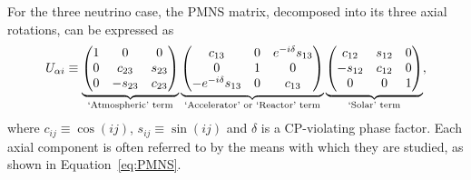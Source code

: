 For the three neutrino case, the PMNS matrix, decomposed into its three axial rotations, can be expressed as
\begin{equation}
  U_{\alpha i} \equiv
  \underbrace{
    \begin{pmatrix}
      1 & 0 & 0 \\
      0 & c_{23} & s_{23} \\
      0 & -s_{23} & c_{23} \\
    \end{pmatrix}
  }_{\textnormal{`Atmospheric' term}}
  \underbrace{
    \begin{pmatrix}
      c_{13} & 0 & e^{-i\delta} s_{13} \\
      0 & 1 & 0 \\
      -e^{-i\delta} s_{13} & 0 & c_{13} \\
    \end{pmatrix}
  }_{\textnormal{`Accelerator' or `Reactor' term}}
  \underbrace{
    \begin{pmatrix}
      c_{12} & s_{12} & 0 \\
      -s_{12} & c_{12} & 0 \\
      0 & 0 & 1 \\
    \end{pmatrix}
  }_{\textnormal{`Solar' term}}
  ,
  \label{eq:PMNS}
\end{equation}
where $c_{ij} \equiv \cos{(ij)}$, $s_{ij} \equiv \sin{(ij)}$ and $\delta$ is a CP-violating phase factor.  Each axial component is often referred to by the means with which they are studied, as shown in Equation~\ref{eq:PMNS}.

